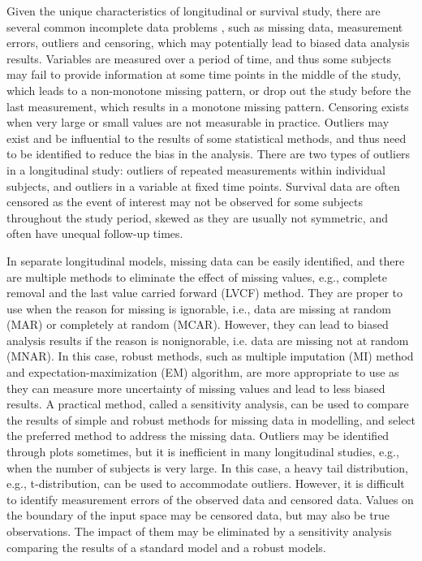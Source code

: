 Given the unique characteristics of longitudinal or survival study, there are several common incomplete data problems \cite{wu2009mixed}, such as missing data, measurement errors, outliers and censoring, which may potentially lead to biased data analysis results. Variables are measured over a period of time, and thus some subjects may fail to provide information at some time points in the middle of the study, which leads to a non-monotone missing pattern, or drop out the study before the last measurement, which results in a monotone missing pattern. Censoring exists when very large or small values are not measurable in practice. Outliers may exist and be influential to the results of some statistical methods, and thus need to be identified to reduce the bias in the analysis. There are two types of outliers in a longitudinal study: outliers of repeated measurements within individual subjects, and outliers in a variable at fixed time points. 
%
Survival data are often censored as the event of interest may not be observed for some subjects throughout the study period, skewed as they are usually not symmetric, and often have unequal follow-up times.



In separate longitudinal models, missing data can be easily identified, and there are multiple methods to eliminate the effect of missing values, e.g., complete removal and the last value carried forward (LVCF) method.
They are proper to use when the reason for missing is ignorable, i.e., data are missing at random (MAR) or completely at random (MCAR). However, they can lead to biased analysis results if the reason is nonignorable, i.e. data are missing not at random (MNAR). In this case, robust methods, such as multiple imputation (MI) method and expectation-maximization (EM) algorithm, are more appropriate to use as they can measure more uncertainty of missing values and lead to less biased results. %
A practical method, called a sensitivity analysis, can be used to compare the results of simple and robust methods for missing data in modelling, and select the preferred method to address the missing data. 
Outliers may be identified through plots sometimes, but it is inefficient in many longitudinal studies, e.g., when the number of subjects is very large. In this case, a heavy tail distribution, e.g., t-distribution, can be used to accommodate outliers. 
However, it is difficult to identify measurement errors of the observed data and censored data. Values on the boundary of the input space may be censored data, but may also be true observations. The impact of them may be eliminated by a sensitivity analysis comparing the results of a standard model and a robust models.


